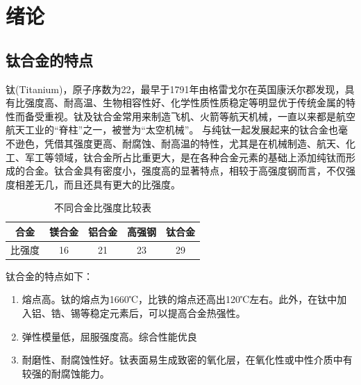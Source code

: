\chapter{绪论}
\section{钛合金的特点}

钛(Titanium)，原子序数为22，最早于1791年由格雷戈尔在英国康沃尔郡发现，具有比强度高、耐高温、生物相容性好、化学性质性质稳定等明显优于传统金属的特性而备受重视。钛及钛合金常用来制造飞机、火箭等航天机械，一直以来都是航空航天工业的“脊柱”之一，被誉为“太空机械”\cite{XJYS200102014}。
与纯钛一起发展起来的钛合金也毫不逊色，凭借其强度更高、耐腐蚀、耐高温的特性，尤其是在机械制造、航天、化工、军工等领域，钛合金所占比重更大，是在各种合金元素的基础上添加纯钛而形成的合金\cite{HSJJ202109005}。钛合金具有密度小，强度高的显著特点，相较于高强度钢而言，不仅强度相差无几，而且还具有更大的比强度。
\begin{table}[htbp]
	\centering
	\label{sec:bqd}
	\caption{不同合金比强度比较表}
	\begin{tabular}{ccccc}
		\toprule
		\textbf{合金} & \textbf{镁合金} & \textbf{铝合金} & \textbf{高强钢} & \textbf{钛合金} \\
		\midrule
		比强度 & 16 & 21 & 23 & 29 \\
		\bottomrule
	\end{tabular}
\end{table}

钛合金的特点如下\cite{1997titanium}：
\begin{enumerate}
	\item 熔点高。钛的熔点为1660℃，比铁的熔点还高出120℃左右。此外，在钛中加入铝、锆、锡等稳定元素后，可以提高合金热强性。
	\item 弹性模量低，屈服强度高。综合性能优良
	\item 耐磨性、耐腐蚀性好。钛表面易生成致密的氧化层，在氧化性或中性介质中有较强的耐腐蚀能力。
\end{enumerate}

